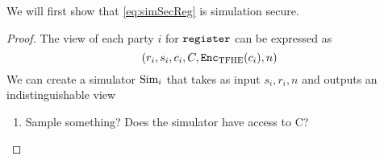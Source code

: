 \begin{lemma}
	We will first show that \cref{eq:simSecReg} is simulation secure.
	\begin{proof}
		The view of each party $i$ for $\texttt{register}$ can be expressed as
		\begin{equation*}
			(r_i, s_i, c_i, C, \texttt{Enc}_{\mathrm{TFHE}}(c_i), n)
		\end{equation*}
		We can create a simulator $\text{Sim}_i$ that takes as input $s_i, r_i, n$ and outputs
		an indistinguishable view
		\begin{enumerate}
			\item Sample something? Does the simulator have access to C?
		\end{enumerate}
	\end{proof}
\end{lemma}


